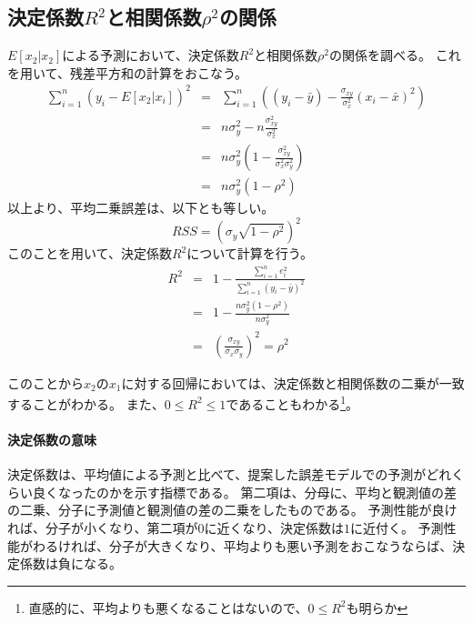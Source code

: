 \subsection{決定係数$R^2$と相関係数$\rho^2$の関係}
$E[x_2|x_2]$による予測において、決定係数$R^2$と相関係数$\rho^2$の関係を調べる。
これを用いて、残差平方和の計算をおこなう。
\begin{eqnarray*}
 \sum_{i=1}^n (y_i-E[x_2|x_i])^2 &=&   \sum_{i=1}^n ((y_i-\bar{y})-\frac{\sigma_{xy}}{\sigma^2_x}(x_i-\bar{x})^2)\\
 &=& n\sigma^2_y -n \frac{\sigma^2_{xy}}{\sigma_x^2} \\
 &=& n\sigma_y^2(1-\frac{\sigma^2_{xy}}{\sigma^2_x\sigma_y^2}) \\
 &=& n\sigma_y^2(1-\rho^2)
\end{eqnarray*}
以上より、平均二乗誤差は、以下とも等しい。
\begin{equation*}
 RSS = (\sigma_y\sqrt{1-\rho^2})^2
\end{equation*}
このことを用いて、決定係数$R^2$について計算を行う。
\begin{eqnarray*}
 R^2 &=& 1-\frac{\sum_{i=1}^n e_i^2}{\sum_{i=1}^n (y_i-\bar{y})^2} \\
 &=& 1-\frac{n\sigma_y^2(1-\rho^2)}{n\sigma^2_y} \\
 &=& \left( \frac{\sigma_{xy}}{\sigma_x\sigma_y}\right)^2 = \rho^2
\end{eqnarray*}

このことから$x_2$の$x_1$に対する回帰においては、決定係数と相関係数の二乗が一致することがわかる。
また、$0\leq R^2\leq 1$であることもわかる\footnote{直感的に、平均よりも悪くなることはないので、$0\leq R^2$も明らか}。

\paragraph{決定係数の意味}
決定係数は、平均値による予測と比べて、提案した誤差モデルでの予測がどれくらい良くなったのかを示す指標である。
第二項は、分母に、平均と観測値の差の二乗、分子に予測値と観測値の差の二乗をしたものである。
予測性能が良ければ、分子が小くなり、第二項が$0$に近くなり、決定係数は$1$に近付く。
予測性能がわるければ、分子が大きくなり、平均よりも悪い予測をおこなうならば、決定係数は負になる。



